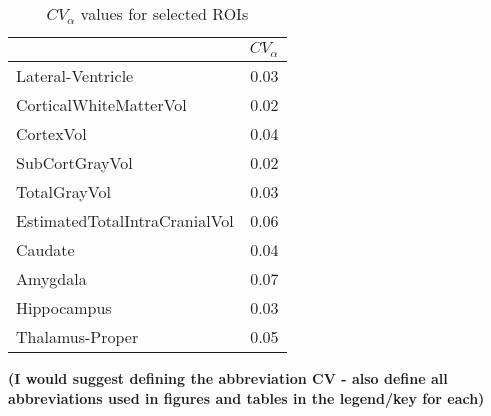 \begin{table}
[]
\centering

\begin{tabular}{lr}
\toprule
{} &   $CV_{\alpha}$ \\
\midrule
Lateral-Ventricle             &  0.03 \\
CorticalWhiteMatterVol        &  0.02 \\
CortexVol                     &  0.04 \\
SubCortGrayVol                &  0.02 \\
TotalGrayVol                  &  0.03 \\
EstimatedTotalIntraCranialVol &  0.06 \\
Caudate                       &  0.04 \\
Amygdala                      &  0.07 \\
Hippocampus                   &  0.03 \\
Thalamus-Proper               &  0.05 \\
\bottomrule
\end{tabular}
\caption{$CV_{\alpha}$ values for selected ROIs}
\label{tab:cva} \textbf{(I would suggest defining the abbreviation CV - also define all abbreviations used in figures and tables in the legend/key for each)}\textit{}

\end{table}